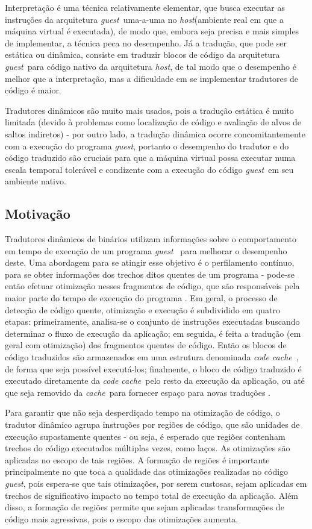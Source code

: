 \documentclass[12pt,twoside]{article}
\newcommand{\ccache}{\emph{code cache}}
\newcommand{\cache}{\emph{cache}}
\newcommand{\guest}{\emph{guest}}
\newcommand{\host}{\emph{host}}
\begin{document}
Interpretação é uma técnica relativamente elementar, que busca executar as instruções da arquitetura \guest~uma-a-uma no \host (ambiente real em que a máquina virtual é executada), de modo que, embora seja precisa e mais simples de implementar, a técnica peca no desempenho. Já a tradução, que pode ser estática ou dinâmica, consiste em traduzir blocos de código da arquitetura \guest~para código nativo da arquitetura \host, de tal modo que o desempenho é melhor que a interpretação, mas a dificuldade em se implementar tradutores de código é maior.

Tradutores dinâmicos são muito mais usados, pois a tradução estática é muito limitada (devido à problemas como localização de código e avaliação de alvos de saltos indiretos) - por outro lado, a tradução dinâmica ocorre concomitantemente com a execução do programa \guest, portanto o desempenho do tradutor e do código traduzido são cruciais para que a máquina virtual possa executar numa escala temporal tolerável e condizente com a execução do código \guest~em seu ambiente nativo.


\subsection{Motivação}
Tradutores dinâmicos de binários utilizam informações sobre o comportamento em tempo de execução de um programa \guest~ para melhorar o desempenho deste. Uma abordagem para se atingir esse objetivo é o perfilamento contínuo, para se obter informações dos trechos ditos quentes de um programa - pode-se então efetuar otimização nesses fragmentos de código, que são responsáveis pela maior parte do tempo de execução do programa \cite{guido-2012}. Em geral, o processo de detecção de código quente, otimização e execução é subdividido em quatro etapas: primeiramente, analisa-se o conjunto de instruções executadas buscando determinar o fluxo de execução da aplicação; em seguida, é feita a tradução (em geral com otimização) dos fragmentos quentes de código. Então os blocos de código traduzidos são armazenados em uma estrutura denominada \ccache~, de forma que seja possível executá-los;  finalmente, o bloco de código traduzido é executado diretamente da \ccache~pelo resto da execução da aplicação, ou até que seja removido da \cache~para fornecer espaço para novas traduções \cite{kim-2004}.

Para garantir que não seja desperdiçado tempo na otimização de código, o tradutor dinâmico agrupa instruções por regiões de código, que são unidades de execução supostamente quentes - ou seja, é esperado que regiões contenham trechos do código executados múltiplas vezes, como laços. As otimizações são aplicadas no escopo de tais regiões. A formação de regiões é importante principalmente no que toca a qualidade das otimizações realizadas no código \guest, pois espera-se que tais otimizações, por serem custosas, sejam aplicadas em trechos de significativo impacto no tempo total de execução da aplicação. Além disso, a formação de regiões permite que sejam aplicadas transformações de código mais agressivas, pois o escopo das otimizações aumenta.
\end{document}
